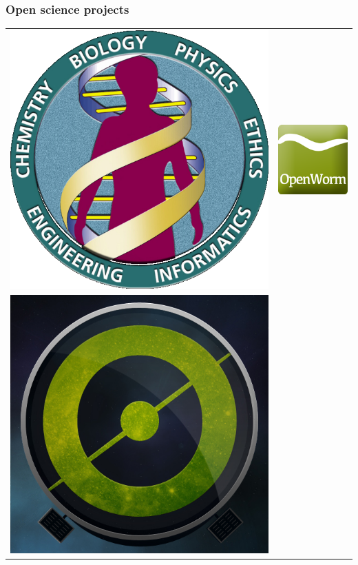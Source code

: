 \documentclass{beamer}
\begin{document}
\begin{frame}\frametitle{Open science projects}
\centering
\begin{tabular}{cc}
	\includegraphics[height=0.3\textheight]{gfx/present/HGP}
	&
	\includegraphics[height=0.3\textheight]{gfx/present/OpenWormLogo}
	\\
	\includegraphics[height=0.3\textheight]{gfx/present/Galaxyzoo}

\end{tabular}
\end{frame}
\end{document}
